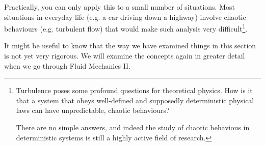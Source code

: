 \documentclass[11pt]{article}
\numberwithin{equation}{section}
\begin{document}
			Practically, you can only apply this to a small number of situations. Most situations in everyday life (e.g. a car driving down a highway) involve chaotic behaviours (e.g. turbulent flow) that would make such analysis very difficult\footnote{Turbulence poses some profound questions for theoretical physics. How is it that a system that obeys well-defined and supposedly deterministic physical laws can have unpredictable, chaotic behaviours? \par There are no simple answers, and indeed the study of chaotic behavious in deterministic systems is still a highly active field of research.}.
			
			\vfill
			\hdashrule{\textwidth}{0.1mm}{1pt}
			
			It might be useful to know that the way we have examined things in this section is not yet very rigorous. We will examine the concepts again in greater detail when we go through Fluid Mechanics II. 
			\vspace{-0.2cm}
			
			\hdashrule{\textwidth}{0.1mm}{1pt}
			\vfill
		\newpage
		
\end{document}
